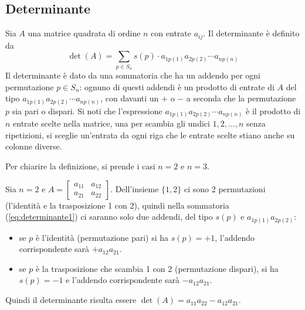 \subsection{Determinante}
\label{sec:determinante}

\begin{defi}
  \label{defi:determinante1}
  Sia $A$ una matrice quadrata di ordine $n$ con entrate $a_{ij}$. Il determinante è
  definito da
  \begin{equation}
    \label{eq:determinante1}
    \det (A)=\sum_{p\in S_n}s(p)\cdot a_{1p(1)}a_{2p(2)}\cdots a_{np(n)}
  \end{equation}
  Il determinante è dato da una sommatoria che ha un addendo per ogni permutazione
  $p\in S_n$: ognuno di questi addendi è un prodotto di entrate di $A$ del tipo
  $a_{1p(1)}a_{2p(2)}\cdots a_{np(n)}$, con davanti un $+$ o $-$ a seconda che la
  permutazione $p$ sia pari o dispari. Si noti che l'espressione
  $a_{1p(1)}a_{2p(2)}\cdots a_{np(n)}$ è il prodotto di $n$ entrate scelte nella
  matrice, una per scambia gli undici $1,2,\dots,n$ senza ripetizioni, si sceglie
  un'entrata da ogni riga che le entrate scelte stiano anche su colonne diverse.
\end{defi}
Per chiarire la definizione, si prende i casi $n = 2$ e $n=3$.

Sia $n=2$ e $A=
\begin{bmatrix}
  a_{11} & a_{12}\\
  a_{21} & a_{22}
\end{bmatrix}
$. Dell'insieme $\{1,2\}$ ci sono 2 permutazioni (l'identità e la trasposizione 1
con 2), quindi nella sommatoria (\ref{eq:determinante1}) ci saranno solo due
addendi, del tipo $s(p)$ e $a_{1p(1)}a_{2p(2)}$:
\begin{itemize}
\item se $p$ è l'identità (permutazione pari) si ha $s(p)=+1$, l'addendo
  corrispondente sarà $+a_{12} a_{21}$.
\item se $p$ è la trasposizione che scambia 1 con 2 (permutazione dispari), si ha
  $s(p)=-1$ e l'addendo corrispondente sarà $-a_{12} a_{21}$.
\end{itemize}
Quindi il determinante risulta essere $\det(A)=a_{11}a_{22} -a_{12} a_{21}$.

